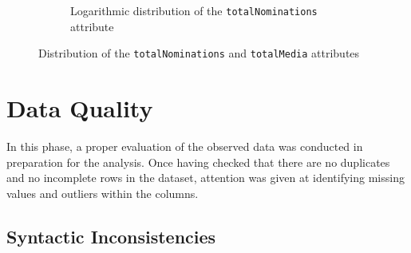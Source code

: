 \begin{figure}[H]
\begin{subfigure}{0.48\textwidth}
        \caption{Logarithmic distribution of the \texttt{totalNominations} attribute}
        \label{fig:sub2}
    \end{subfigure}
    \caption{Distribution of the \texttt{totalNominations} and \texttt{totalMedia} attributes}
    \label{fig:distrib}
\end{figure}



\section{Data Quality}\label{sec:data_quality}
In this phase, a proper evaluation of the observed data was conducted in preparation for the analysis.
Once having checked that there are no duplicates and no incomplete rows in the dataset, 
attention was given at identifying missing values and outliers within the columns.



\subsection{Syntactic Inconsistencies}



